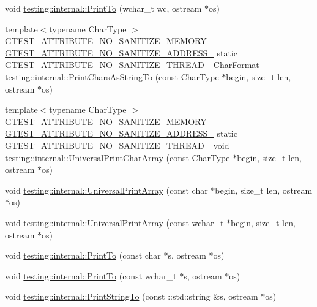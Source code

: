 \begin{DoxyCompactItemize}
void \mbox{\hyperlink{namespacetesting_1_1internal_aa74ea9d64f76ce69eceb225ca5ebef58}{testing\+::internal\+::\+Print\+To}} (wchar\+\_\+t wc, ostream $\ast$os)
\item 
{\footnotesize template$<$typename Char\+Type $>$ }\\\mbox{\hyperlink{gtest-port_8h_a2a83dd79037e53814a509cc3f5702650}{G\+T\+E\+S\+T\+\_\+\+A\+T\+T\+R\+I\+B\+U\+T\+E\+\_\+\+N\+O\+\_\+\+S\+A\+N\+I\+T\+I\+Z\+E\+\_\+\+M\+E\+M\+O\+R\+Y\+\_\+}} \mbox{\hyperlink{gtest-port_8h_af18b465f4ba6e36eea7a8d2d79521873}{G\+T\+E\+S\+T\+\_\+\+A\+T\+T\+R\+I\+B\+U\+T\+E\+\_\+\+N\+O\+\_\+\+S\+A\+N\+I\+T\+I\+Z\+E\+\_\+\+A\+D\+D\+R\+E\+S\+S\+\_\+}} static \mbox{\hyperlink{gtest-port_8h_abf30a6b1b3a12ecb2cc1bc1a6f5f9646}{G\+T\+E\+S\+T\+\_\+\+A\+T\+T\+R\+I\+B\+U\+T\+E\+\_\+\+N\+O\+\_\+\+S\+A\+N\+I\+T\+I\+Z\+E\+\_\+\+T\+H\+R\+E\+A\+D\+\_\+}} Char\+Format \mbox{\hyperlink{namespacetesting_1_1internal_aa74d42b9fdd837ae0af3044acc77aac9}{testing\+::internal\+::\+Print\+Chars\+As\+String\+To}} (const Char\+Type $\ast$begin, size\+\_\+t len, ostream $\ast$os)
\item 
{\footnotesize template$<$typename Char\+Type $>$ }\\\mbox{\hyperlink{gtest-port_8h_a2a83dd79037e53814a509cc3f5702650}{G\+T\+E\+S\+T\+\_\+\+A\+T\+T\+R\+I\+B\+U\+T\+E\+\_\+\+N\+O\+\_\+\+S\+A\+N\+I\+T\+I\+Z\+E\+\_\+\+M\+E\+M\+O\+R\+Y\+\_\+}} \mbox{\hyperlink{gtest-port_8h_af18b465f4ba6e36eea7a8d2d79521873}{G\+T\+E\+S\+T\+\_\+\+A\+T\+T\+R\+I\+B\+U\+T\+E\+\_\+\+N\+O\+\_\+\+S\+A\+N\+I\+T\+I\+Z\+E\+\_\+\+A\+D\+D\+R\+E\+S\+S\+\_\+}} static \mbox{\hyperlink{gtest-port_8h_abf30a6b1b3a12ecb2cc1bc1a6f5f9646}{G\+T\+E\+S\+T\+\_\+\+A\+T\+T\+R\+I\+B\+U\+T\+E\+\_\+\+N\+O\+\_\+\+S\+A\+N\+I\+T\+I\+Z\+E\+\_\+\+T\+H\+R\+E\+A\+D\+\_\+}} void \mbox{\hyperlink{namespacetesting_1_1internal_ad896a4e4d9133ce43dc18b6038d95dc3}{testing\+::internal\+::\+Universal\+Print\+Char\+Array}} (const Char\+Type $\ast$begin, size\+\_\+t len, ostream $\ast$os)
\item 
void \mbox{\hyperlink{namespacetesting_1_1internal_a070107e7a8205ad6ec4d538d52b15b38}{testing\+::internal\+::\+Universal\+Print\+Array}} (const char $\ast$begin, size\+\_\+t len, ostream $\ast$os)
\item 
void \mbox{\hyperlink{namespacetesting_1_1internal_a52394019018eb5079f9f1bcca23dcd60}{testing\+::internal\+::\+Universal\+Print\+Array}} (const wchar\+\_\+t $\ast$begin, size\+\_\+t len, ostream $\ast$os)
\item 
void \mbox{\hyperlink{namespacetesting_1_1internal_adc6c98306d40b53fd07be4e295102a0a}{testing\+::internal\+::\+Print\+To}} (const char $\ast$s, ostream $\ast$os)
\item 
void \mbox{\hyperlink{namespacetesting_1_1internal_afc20fb56b2547a8f91f9ff99650f2024}{testing\+::internal\+::\+Print\+To}} (const wchar\+\_\+t $\ast$s, ostream $\ast$os)
\item 
void \mbox{\hyperlink{namespacetesting_1_1internal_ad609167d8d6792b0fb186539e0e159bd}{testing\+::internal\+::\+Print\+String\+To}} (const \+::std\+::string \&s, ostream $\ast$os)
\end{DoxyCompactItemize}
